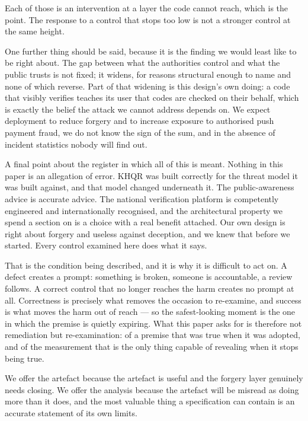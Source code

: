 \documentclass[10pt,a4paper,twocolumn]{article}
\begin{document}
Each of those is an intervention at a layer the code cannot reach, which is the
point. The response to a control that stops too low is not a stronger control at
the same height.

One further thing should be said, because it is the finding we would least like
to be right about. The gap between what the authorities control and what the
public trusts is not fixed; it widens, for reasons structural enough to name and
none of which reverse. Part of that widening is this design's own doing: a code
that visibly verifies teaches its user that codes are checked on their behalf,
which is exactly the belief the attack we cannot address depends on. We expect
deployment to reduce forgery and to increase exposure to authorised push payment
fraud, we do not know the sign of the sum, and in the absence of incident
statistics nobody will find out.

A final point about the register in which all of this is meant. Nothing in this
paper is an allegation of error. KHQR was built correctly for the threat model
it was built against, and that model changed underneath it. The public-awareness
advice is accurate advice. The national verification platform is competently
engineered and internationally recognised, and the architectural property we
spend a section on is a choice with a real benefit attached. Our own design is
right about forgery and useless against deception, and we knew that before we
started. Every control examined here does what it says.

That is the condition being described, and it is why it is difficult to act on.
A defect creates a prompt: something is broken, someone is accountable, a review
follows. A correct control that no longer reaches the harm creates no prompt at
all. Correctness is precisely what removes the occasion to re-examine, and
success is what moves the harm out of reach --- so the safest-looking moment is
the one in which the premise is quietly expiring. What this paper asks for is
therefore not remediation but re-examination: of a premise that was true when it
was adopted, and of the measurement that is the only thing capable of revealing
when it stops being true.

We offer the artefact because the artefact is useful and the forgery layer
genuinely needs closing. We offer the analysis because the artefact will be
misread as doing more than it does, and the most valuable thing a specification
can contain is an accurate statement of its own limits.
\end{document}

